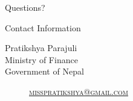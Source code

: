 \documentclass[
 size=14pt,
 paper=smartboard,  %
 mode=present, 		%
 display=slides, 	%
 style=tuliplab,  	%
 pauseslide,
 fleqn,leqno]{powerdot}
\begin{document}
%
\begin{slide}[toc=,bm=]{Questions?}
\begin{center}
\begin{figure}
\end{figure}
\end{center}
\end{slide}


\begin{wideslide}[toc=,bm=]{Contact Information}
\centering
{}
\twocolumn[
lcolwidth=0.35\linewidth,
rcolwidth=0.65\linewidth
]
{
}
{
Pratikshya Parajuli\\
Ministry of Finance\\
Government of Nepal
\begin{description}
 \item[\textcolor{orange}{\faEnvelope}] \href{mailto:gangli@tulip.org.au}
 {\textsc{\footnotesize{misspratikshya@gmail.com}}}
\end{description}
}
\end{wideslide}
\end{document}
